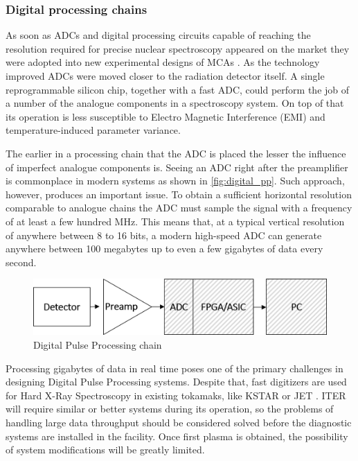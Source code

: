 \subsubsection{Digital processing chains}

As soon as ADCs and digital processing circuits capable of
reaching the resolution required for precise nuclear
spectroscopy appeared on the market they were 
adopted into new experimental designs of MCAs \cite{mca_fpga}.
As the technology improved ADCs were moved closer to the 
radiation detector itself.
A single reprogrammable silicon chip, together with a fast ADC,
could perform the job of a number of the analogue components
in a spectroscopy system.
On top of that its operation is less susceptible to Electro Magnetic
Interference (EMI) and temperature-induced parameter variance.
\cite{dpp_walewski}


The earlier in a processing chain that the ADC is placed the
lesser the influence of imperfect analogue components is.
Seeing an ADC right after the preamplifier is commonplace
in modern systems as shown in \autoref{fig:digital_pp}.
Such approach, however, produces an important issue.
To obtain a sufficient horizontal resolution comparable to analogue chains
the ADC must sample the signal with a frequency of at least
a few hundred MHz. This means that, at a typical vertical resolution
of anywhere between 8 to 16 bits, a modern high-speed ADC
can generate anywhere between 100 megabytes 
up to even a few gigabytes of data every second.
\cite{dpp_walewski}
\begin{figure}[h]
  \centering
  \includegraphics[width=.7\linewidth]{media/digital_pulse_processing.png}
  \caption{Digital Pulse Processing chain}
  \label{fig:digital_pp}
\end{figure}

Processing gigabytes of data in real time poses one of 
the primary challenges in designing Digital Pulse Processing systems.
Despite that, fast digitizers are used for Hard X-Ray Spectroscopy
in existing tokamaks, like KSTAR or JET \cite{hxrm_jet, kstar_upgrade}.
ITER will require similar or better systems during its operation,
so the problems of handling large data throughput
should be considered solved before the diagnostic systems
are installed in the facility. Once first plasma is obtained,
the possibility of system modifications will be greatly limited.
 


